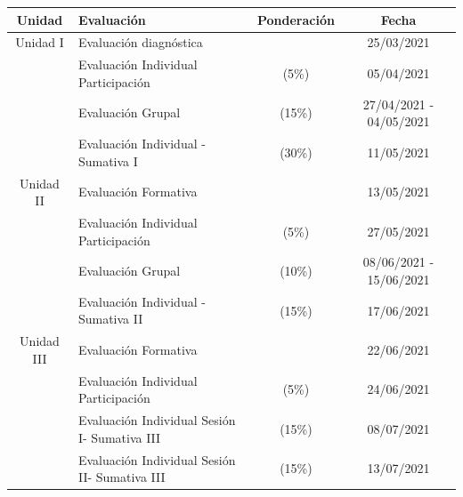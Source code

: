 \documentclass[12 pt,letterpaper]{article}
\begin{document}
\begin{center}
\begin{tabular}{|c|l|c|c|}
	\hline
	Unidad & Evaluación & Ponderación & Fecha \\
	\hline
	Unidad I & Evaluación diagnóstica & & 25/03/2021 \\
	\hline
	& Evaluación Individual Participación & (5\%) & 05/04/2021 \\
	\hline
	& Evaluación Grupal & (15\%) & 27/04/2021 - 04/05/2021 \\
	\hline
	& Evaluación Individual - Sumativa I & (30\%) & 11/05/2021 \\
	\hline
	Unidad II & Evaluación Formativa & & 13/05/2021 \\
	\hline
	& Evaluación Individual Participación & (5\%) & 27/05/2021 \\
	\hline
	& Evaluación Grupal & (10\%) & 08/06/2021 - 15/06/2021 \\
	\hline
	& Evaluación Individual - Sumativa II & (15\%) & 17/06/2021 \\
	\hline
	Unidad III & Evaluación Formativa & & 22/06/2021 \\
	\hline
	& Evaluación Individual Participación & (5\%) & 24/06/2021 \\
	\hline
	& Evaluación Individual Sesión I- Sumativa III & (15\%) & 08/07/2021 \\
	\hline
	& Evaluación Individual Sesión II- Sumativa III & (15\%) & 13/07/2021 \\
	\hline
\end{tabular}
\end{center}
\end{document}
